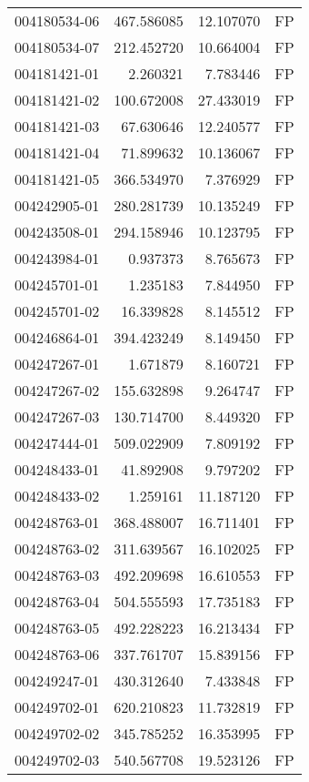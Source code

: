 \begin{tabular}{lrrl}
004180534-06 &  467.586085 &    12.107070 &   FP \\
004180534-07 &  212.452720 &    10.664004 &   FP \\
004181421-01 &    2.260321 &     7.783446 &   FP \\
004181421-02 &  100.672008 &    27.433019 &   FP \\
004181421-03 &   67.630646 &    12.240577 &   FP \\
004181421-04 &   71.899632 &    10.136067 &   FP \\
004181421-05 &  366.534970 &     7.376929 &   FP \\
004242905-01 &  280.281739 &    10.135249 &   FP \\
004243508-01 &  294.158946 &    10.123795 &   FP \\
004243984-01 &    0.937373 &     8.765673 &   FP \\
004245701-01 &    1.235183 &     7.844950 &   FP \\
004245701-02 &   16.339828 &     8.145512 &   FP \\
004246864-01 &  394.423249 &     8.149450 &   FP \\
004247267-01 &    1.671879 &     8.160721 &   FP \\
004247267-02 &  155.632898 &     9.264747 &   FP \\
004247267-03 &  130.714700 &     8.449320 &   FP \\
004247444-01 &  509.022909 &     7.809192 &   FP \\
004248433-01 &   41.892908 &     9.797202 &   FP \\
004248433-02 &    1.259161 &    11.187120 &   FP \\
004248763-01 &  368.488007 &    16.711401 &   FP \\
004248763-02 &  311.639567 &    16.102025 &   FP \\
004248763-03 &  492.209698 &    16.610553 &   FP \\
004248763-04 &  504.555593 &    17.735183 &   FP \\
004248763-05 &  492.228223 &    16.213434 &   FP \\
004248763-06 &  337.761707 &    15.839156 &   FP \\
004249247-01 &  430.312640 &     7.433848 &   FP \\
004249702-01 &  620.210823 &    11.732819 &   FP \\
004249702-02 &  345.785252 &    16.353995 &   FP \\
004249702-03 &  540.567708 &    19.523126 &   FP \\

\end{tabular}
